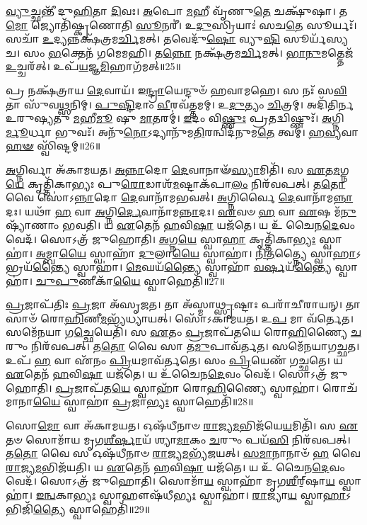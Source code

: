 \-\ul{𑌵𑍍𑌯𑍁}\-𑌚𑍍𑌛𑌨𑍍𑌤𑍀᳴ 𑌦𑍁\-\ul{𑌹𑌿}\-𑌤𑌾 \ul{𑌦𑌿}\-𑌵𑌃।
\-\ul{𑌅}\-𑌪𑍋 \ul{𑌮}\-𑌹𑍀 𑌵𑍃᳴𑌣𑍁\-\ul{𑌤𑍇} 𑌚𑌕𑍍𑌷𑍁᳴𑌷𑌾।
𑌤\-\ul{𑌮𑍋} 𑌜𑍍𑌯𑍋𑌤𑌿᳴𑌷𑍍𑌕𑍃𑌣𑍋𑌤𑌿 \ul{𑌸𑍂}\-𑌨𑌰𑍀॑।
𑌉\-\ul{𑌦𑍁}\-𑌸𑍍𑌰𑌿𑌯𑌾𑌃॑ 𑌸𑌚\-\ul{𑌤𑍇} 𑌸𑍂𑌰𑍍𑌯𑌃᳴।
𑌸𑌚𑌾᳴ \ul{𑌉}\-𑌦𑍍𑌯𑌨𑍍𑌨𑌕𑍍𑌷᳴𑌤𑍍𑌰𑌮\-\ul{𑌰𑍍𑌚𑌿}\-𑌮𑌤𑍍।
𑌤𑌵𑍇𑌦𑍁᳴\-\ul{𑌷𑍋} 𑌵𑍍𑌯𑍁\-\ul{𑌷𑌿} 𑌸𑍂𑌰𑍍𑌯᳴𑌸𑍍𑌯 𑌚।
𑌸𑌂 \ul{𑌭}\-𑌕𑍍𑌤𑍇𑌨᳴ 𑌗𑌮𑍇𑌮𑌹𑌿।
𑌤\-\ul{𑌨𑍍𑌨𑍋} 𑌨𑌕𑍍𑌷᳴𑌤𑍍𑌰𑌮\-\ul{𑌰𑍍𑌚𑌿}\-𑌮𑌤𑍍।
\-\ul{𑌭𑌾}\-\-\ul{𑌨𑍁}\-𑌮𑌤𑍍𑌤𑍇𑌜᳴ \ul{𑌉}\-𑌚𑍍𑌚𑌰᳴𑌤𑍍।
𑌉𑌪᳴\-\ul{𑌯}\-𑌜𑍍𑌞\-\ul{𑌮𑌿}\-𑌹𑌾𑌗᳴𑌮𑌤𑍍॥25॥

𑌪𑍍𑌰 𑌨𑌕𑍍𑌷᳴𑌤𑍍𑌰𑌾𑌯 \ul{𑌦𑍇}\-𑌵𑌾𑌯᳴।
𑌇\-\ul{𑌨𑍍𑌦𑍍𑌰𑌾}\-𑌯𑍇𑌨𑍍𑌦𑍁𑍞᳴ 𑌹𑌵𑌾𑌮𑌹𑍇।
𑌸 𑌨𑌃᳴ 𑌸\-\ul{𑌵𑌿}\-𑌤𑌾 𑌸𑍁᳴𑌵\-\ul{𑌥𑍍𑌸}\-𑌨𑌿𑌮𑍍।
\-\ul{𑌪𑍁}\-\-\ul{𑌷𑍍𑌟𑌿}\-𑌦𑌾𑌂 \ul{𑌵𑍀}\-𑌰𑌵᳴𑌤𑍍𑌤𑌮𑌮𑍍।
𑌉\-\ul{𑌦𑍁}\-𑌤𑍍𑌯𑌂 \ul{𑌚𑌿}\-𑌤𑍍𑌰𑌮𑍍।
𑌅𑌦𑌿᳴𑌤𑌿𑌰𑍍𑌨 𑌉𑌰𑍁𑌷𑍍𑌯𑌤𑍁 \ul{𑌮}\-𑌹𑍀\-\ul{𑌮𑍂} 𑌷𑍁 \ul{𑌮𑌾}\-𑌤𑌰𑌮𑍍॑।
\-\ul{𑌇}\-𑌦𑌂 𑌵𑌿\-\ul{𑌷𑍍𑌣𑍁𑌃} 𑌪𑍍𑌰𑌤𑌦𑍍𑌵𑌿𑌷𑍍𑌣𑍁𑌃᳴।
\-\ul{𑌅}\-𑌗𑍍𑌨𑌿\-\ul{𑌰𑍍𑌮𑍂}\-𑌰𑍍𑌧𑌾 𑌭𑍁𑌵𑌃᳴।
𑌅𑌨𑍁᳴\-\ul{𑌨𑍋}\-\-𑌽𑌦𑍍𑌯𑌾𑌨𑍁᳴𑌮\-\ul{𑌤𑌿}\-𑌰𑌨𑍍𑌵𑌿𑌦᳴𑌨𑍁𑌮\-\ul{𑌤𑍇} 𑌤𑍍𑌵𑌮𑍍।
\-\ul{𑌹}\-\-\ul{𑌵𑍍𑌯}\-𑌵𑌾\-\ul{𑌹}\-\-\ul{𑍟} 𑌸𑍍𑌵𑌿᳴𑌷𑍍𑌟𑌮𑍍॥26॥\anuvakamend[\-\ul{𑌆}\-\-\ul{𑌯}\-𑌤𑍍𑌯᳴𑌗\-\ul{𑌮}\-𑌥𑍍𑌸𑍍𑌵𑌿᳴𑌷𑍍𑌟𑌮𑍍]

\-\ul{𑌅}\-𑌗𑍍𑌨𑌿𑌰𑍍𑌵𑌾 𑌅᳴𑌕𑌾𑌮𑌯𑌤।
\-\ul{𑌅}\-\-\ul{𑌨𑍍𑌨𑌾}\-𑌦𑍋 \ul{𑌦𑍇}\-𑌵𑌾𑌨𑌾𑍟᳴\-\ul{𑌸𑍍𑌯𑌾}\-𑌮𑌿𑌤𑌿᳴।
𑌸 \ul{𑌏}\-𑌤\-\ul{𑌮}\-𑌗𑍍𑌨\-\ul{𑌯𑍇} 𑌕𑍃𑌤𑍍𑌤𑌿᳴𑌕𑌾𑌭𑍍𑌯𑌃 𑌪𑍁\-\ul{𑌰𑍋}\-𑌡𑌾𑌶᳴\-\ul{𑌮}\-𑌷𑍍𑌟𑌾\-𑌕᳴𑌪𑌾\-\ul{𑌲𑌂} 𑌨𑌿𑌰᳴𑌵𑌪𑌤𑍍।
𑌤\-\ul{𑌤𑍋} 𑌵𑍈 𑌸𑍋॑\-𑌽\-\ul{𑌨𑍍𑌨𑌾}\-𑌦𑍋 \ul{𑌦𑍇}\-𑌵𑌾𑌨𑌾᳴𑌮𑌭𑌵𑌤𑍍।
\-\ul{𑌅}\-𑌗𑍍𑌨𑌿𑌰𑍍𑌵𑍈 \ul{𑌦𑍇}\-𑌵𑌾𑌨𑌾᳴𑌮\-\ul{𑌨𑍍𑌨𑌾}\-𑌦𑌃।
𑌯𑌥𑌾᳴ \ul{𑌹} 𑌵𑌾 \ul{𑌅}\-𑌗𑍍𑌨𑌿\-\ul{𑌰𑍍𑌦𑍇}\-𑌵𑌾𑌨𑌾᳴𑌮\-\ul{𑌨𑍍𑌨𑌾}\-𑌦𑌃।
\-\ul{𑌏}\-𑌵𑍞 \ul{𑌹} 𑌵𑌾 \ul{𑌏}\-𑌷 𑌮᳴\-\ul{𑌨𑍁}\-𑌷𑍍𑌯𑌾᳴𑌣𑌾𑌂 𑌭𑌵𑌤𑌿।
𑌯 \ul{𑌏}\-𑌤𑍇𑌨᳴ \ul{𑌹}\-𑌵𑌿\-\ul{𑌷𑌾} 𑌯𑌜᳴𑌤𑍇।
𑌯 𑌉᳴ 𑌚𑍈𑌨\-\ul{𑌦𑍇}\-𑌵𑌂 𑌵𑍇𑌦᳴।
𑌸𑍋𑌽𑌤𑍍𑌰᳴ 𑌜𑍁𑌹𑍋𑌤𑌿।
\-\ul{𑌅}\-𑌗𑍍𑌨\-\ul{𑌯𑍇} 𑌸𑍍𑌵𑌾\-\ul{𑌹𑌾} 𑌕𑍃𑌤𑍍𑌤𑌿᳴𑌕𑌾\-\ul{𑌭𑍍𑌯𑌃} 𑌸𑍍𑌵𑌾𑌹𑌾॑।
\-\ul{𑌅}\-𑌮𑍍𑌬𑌾\-\ul{𑌯𑍈} 𑌸𑍍𑌵𑌾𑌹𑌾᳴ \ul{𑌦𑍁}\-𑌲𑌾\-\ul{𑌯𑍈} 𑌸𑍍𑌵𑌾𑌹𑌾॑।
\-\ul{𑌨𑌿}\-\-\ul{𑌤}\-𑌤𑍍𑌨𑍍𑌯𑍈 𑌸𑍍𑌵𑌾\-\ul{𑌹𑌾}\-\-𑌽𑌭𑍍𑌰𑌯᳴\-\ul{𑌨𑍍𑌤𑍍𑌯𑍈} 𑌸𑍍𑌵𑌾𑌹𑌾॑।
\-\ul{𑌮𑍇}\-𑌘𑌯᳴\-\ul{𑌨𑍍𑌤𑍍𑌯𑍈} 𑌸𑍍𑌵𑌾𑌹𑌾᳴ \ul{𑌵}\-\-\ul{𑌰𑍍}\-𑌷𑌯᳴\-\ul{𑌨𑍍𑌤𑍍𑌯𑍈} 𑌸𑍍𑌵𑌾𑌹𑌾॑।
\-\ul{𑌚𑍁}\-\-\ul{𑌪𑍁}\-𑌣𑍀𑌕𑌾᳴\-\ul{𑌯𑍈} 𑌸𑍍𑌵𑌾𑌹𑍇𑌤𑌿᳴॥27॥

\-\ul{𑌪𑍍𑌰}\-𑌜𑌾\-𑌪᳴𑌤𑌿𑌃 \ul{𑌪𑍍𑌰}\-𑌜𑌾 𑌅᳴\-𑌸𑍃𑌜𑌤।
𑌤𑌾 𑌅᳴𑌸𑍍𑌮𑌾\-\ul{𑌥𑍍𑌸𑍃}\-𑌷𑍍𑌟𑌾𑌃 𑌪𑌰𑌾᳴𑌚𑍀𑌰𑌾𑌯𑌨𑍍।
𑌤𑌾𑌸𑌾𑍞᳴ 𑌰𑍋\-\ul{𑌹𑌿}\-𑌣𑍀\-\ul{𑌮}\-𑌭𑍍𑌯᳴𑌧𑍍𑌯𑌾𑌯𑌤𑍍।
𑌸𑍋᳴𑌽𑌕𑌾𑌮𑌯𑌤।
𑌉\-\ul{𑌪} 𑌮𑌾 𑌵᳴𑌰𑍍𑌤𑍇𑌤।
𑌸𑌮𑍇᳴𑌨𑌯𑌾 𑌗\-\ul{𑌚𑍍𑌛𑍇}\-𑌯𑍇𑌤𑌿᳴।
𑌸 \ul{𑌏}\-𑌤𑌂 \ul{𑌪𑍍𑌰}\-𑌜𑌾𑌪᳴𑌤𑌯𑍇 𑌰𑍋\-\ul{𑌹𑌿}\-𑌣𑍍𑌯𑍈 \ul{𑌚}\-𑌰𑍁𑌂 𑌨𑌿𑌰᳴𑌵𑌪𑌤𑍍।
𑌤\-\ul{𑌤𑍋} 𑌵𑍈 𑌸𑌾 𑌤\-\ul{𑌮𑍁}\-𑌪𑌾𑌵᳴𑌰𑍍𑌤𑌤।
𑌸𑌮𑍇᳴𑌨𑌯𑌾𑌗𑌚𑍍𑌛𑌤।
𑌉𑌪᳴ \ul{𑌹} 𑌵𑌾 𑌏᳴𑌨𑌂 \ul{𑌪𑍍𑌰𑌿}\-𑌯𑌮𑌾𑌵᳴𑌰𑍍𑌤𑌤𑍇।
𑌸𑌂 \ul{𑌪𑍍𑌰𑌿}\-𑌯𑍇𑌣᳴ 𑌗𑌚𑍍𑌛𑌤𑍇।
𑌯 \ul{𑌏}\-𑌤𑍇𑌨᳴ \ul{𑌹}\-𑌵𑌿\-\ul{𑌷𑌾} 𑌯𑌜᳴𑌤𑍇।
𑌯 𑌉᳴𑌚𑍈𑌨\-\ul{𑌦𑍇}\-𑌵𑌂 𑌵𑍇𑌦᳴।
𑌸𑍋𑌽𑌤𑍍𑌰᳴ 𑌜𑍁𑌹𑍋𑌤𑌿।
\-\ul{𑌪𑍍𑌰}\-𑌜𑌾𑌪᳴𑌤\-\ul{𑌯𑍇} 𑌸𑍍𑌵𑌾𑌹𑌾᳴ 𑌰𑍋\-\ul{𑌹𑌿}\-𑌣𑍍𑌯𑍈 𑌸𑍍𑌵𑌾𑌹𑌾॑।
𑌰𑍋𑌚᳴𑌮𑌾𑌨𑌾\-\ul{𑌯𑍈} 𑌸𑍍𑌵𑌾𑌹𑌾॑ \ul{𑌪𑍍𑌰}\-𑌜𑌾\-\ul{𑌭𑍍𑌯𑌃} 𑌸𑍍𑌵𑌾𑌹𑍇𑌤𑌿᳴॥28॥

𑌸𑍋\-\ul{𑌮𑍋} 𑌵𑌾 𑌅᳴𑌕𑌾𑌮𑌯𑌤।
𑌓𑌷᳴𑌧𑍀𑌨𑌾𑍞 \ul{𑌰𑌾}\-𑌜𑍍𑌯\-\ul{𑌮}\-𑌭𑌿𑌜᳴𑌯𑍇\-\ul{𑌯}\-𑌮𑌿𑌤𑌿᳴।
𑌸 \ul{𑌏}\-𑌤𑍞 𑌸𑍋𑌮𑌾᳴𑌯 𑌮𑍃𑌗\-\ul{𑌶𑍀}\-\-\ul{𑌰𑍍}\-𑌷𑌾𑌯᳴ 𑌶𑍍𑌯𑌾\-\ul{𑌮𑌾}\-𑌕𑌂 \ul{𑌚}\-𑌰𑍁𑌂 𑌪𑌯᳴\-\ul{𑌸𑌿} 𑌨𑌿𑌰᳴𑌵𑌪𑌤𑍍।
𑌤\-\ul{𑌤𑍋} 𑌵𑍈 𑌸 𑌓𑌷᳴𑌧𑍀𑌨𑌾𑍞 \ul{𑌰𑌾}\-𑌜𑍍𑌯\-\ul{𑌮}\-𑌭𑍍𑌯᳴𑌜𑌯𑌤𑍍।
\-\ul{𑌸}\-\-\ul{𑌮𑌾}\-𑌨𑌾𑌨𑌾𑍞᳴ \ul{𑌹} 𑌵𑍈 \ul{𑌰𑌾}\-𑌜𑍍𑌯\-\ul{𑌮}\-𑌭𑌿𑌜᳴𑌯𑌤𑌿।
𑌯 \ul{𑌏}\-𑌤𑍇𑌨᳴ \ul{𑌹}\-𑌵𑌿\-\ul{𑌷𑌾} 𑌯𑌜᳴𑌤𑍇।
𑌯 𑌉᳴ 𑌚𑍈𑌨\-\ul{𑌦𑍇}\-𑌵𑌂 𑌵𑍇𑌦᳴।
𑌸𑍋𑌽𑌤𑍍𑌰᳴ 𑌜𑍁𑌹𑍋𑌤𑌿।
𑌸𑍋𑌮𑌾᳴\-\ul{𑌯} 𑌸𑍍𑌵𑌾𑌹𑌾᳴ 𑌮𑍃𑌗\-\ul{𑌶𑍀}\-𑌰𑍍‌॒\mbox{}𑌷𑌾\-\ul{𑌯} 𑌸𑍍𑌵𑌾𑌹𑌾॑।
\-\ul{𑌇}\-\-\ul{𑌨𑍍𑌵}\-𑌕𑌾\-\ul{𑌭𑍍𑌯𑌃} 𑌸𑍍𑌵𑌾𑌹𑍗𑌷᳴𑌧𑍀\-\ul{𑌭𑍍𑌯𑌃} 𑌸𑍍𑌵𑌾𑌹𑌾॑।
\-\ul{𑌰𑌾}\-𑌜𑍍𑌯𑌾\-\ul{𑌯} 𑌸𑍍𑌵𑌾\-\ul{𑌹𑌾}\-\-𑌽𑌭𑌿𑌜𑌿᳴\-\ul{𑌤𑍍𑌯𑍈} 𑌸𑍍𑌵𑌾𑌹𑍇𑌤𑌿᳴॥29॥

